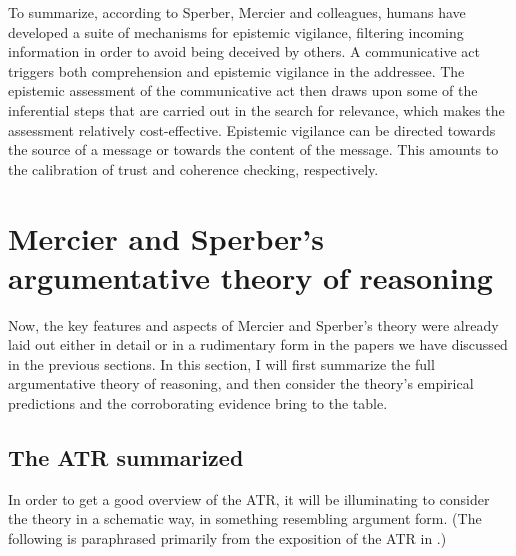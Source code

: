 To summarize, according to Sperber, Mercier and colleagues, humans have developed a suite of mechanisms for epistemic vigilance, filtering incoming information in order to avoid being deceived by others. A communicative act triggers both comprehension and epistemic vigilance in the addressee. The epistemic assessment of the communicative act then draws upon some of the inferential steps that are carried out in the search for relevance, which makes the assessment relatively cost-effective. Epistemic vigilance can be directed towards the source of a message or towards the content of the message. This amounts to the calibration of trust and coherence checking, respectively.

\section{Mercier and Sperber's argumentative theory of reasoning}
\label{sec:MS11}

Now, the key features and aspects of Mercier and Sperber's theory were already laid out either in detail or in a rudimentary form in the papers we have discussed in the previous sections.
In this section, I will first summarize the full argumentative theory of reasoning, and then consider the theory's empirical predictions and the corroborating evidence \citet{MS11} bring to the table.

\subsection{The ATR summarized}

In order to get a good overview of the ATR, it will be illuminating to consider the theory in a schematic way, in something resembling argument form. (The following is paraphrased primarily from the exposition of the ATR in \citealp[p.~60]{MS11}.)

